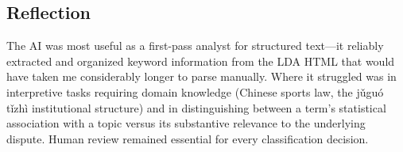 \documentclass[10pt,letterpaper]{article}
\begin{document}
\subsection*{Reflection}

The AI was most useful as a first-pass analyst for structured text---it reliably extracted and organized keyword information from the LDA HTML that would have taken me considerably longer to parse manually. Where it struggled was in interpretive tasks requiring domain knowledge (Chinese sports law, the jǔguó tǐzhì institutional structure) and in distinguishing between a term's statistical association with a topic versus its substantive relevance to the underlying dispute. Human review remained essential for every classification decision.
\end{document}
